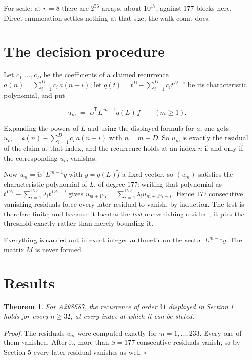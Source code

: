 \documentclass[11pt]{article}
\newtheorem{theorem}{Theorem}
\theoremstyle{definition}
\begin{document}
For scale: at $n = 8$ there are $2^{56}$ arrays, about $10^{17}$, against $177$ blocks here. Direct enumeration settles nothing at that size; the walk count does.

\section{The decision procedure}

Let $c_1,\dots,c_D$ be the coefficients of a claimed recurrence $a(n) = \sum_{i=1}^{D} c_i\,a(n-i)$, let $q(t) = t^{D} - \sum_{i=1}^{D} c_i t^{D-i}$ be its characteristic polynomial, and put

\[u_m \;=\; \tilde w^{\mathsf T} L^{\,m-1} q(L)\,\tilde f \qquad (m \ge 1).\]

Expanding the powers of $L$ and using the displayed formula for $a$, one gets $u_m = a(n) - \sum_{i=1}^{D} c_i\,a(n-i)$ with $n = m + D$. So $u_m$ is exactly the residual of the claim at that index, and the recurrence holds at an index $n$ if and only if the corresponding $u_m$ vanishes.

Now $u_m = \tilde w^{\mathsf T} L^{m-1} y$ with $y = q(L)\tilde f$ a fixed vector, so $(u_m)$ satisfies the characteristic polynomial of $L$, of degree $177$: writing that polynomial as $t^{177} - \sum_{i=1}^{177} \lambda_i t^{177-i}$ gives $u_{m+177} = \sum_{i=1}^{177} \lambda_i u_{m+177-i}$. Hence $177$ consecutive vanishing residuals force every later residual to vanish, by induction. The test is therefore finite; and because it locates the {\itshape last} nonvanishing residual, it pins the threshold exactly rather than merely bounding it.

Everything is carried out in exact integer arithmetic on the vector $L^{m-1}y$. The matrix $M$ is never formed.

\section{Results}

\begin{theorem} For A208687, the recurrence of order $31$ displayed in Section 1 holds for every $n \ge 32$, at every index at which it can be stated.\end{theorem}

{\itshape Proof.} The residuals $u_m$ were computed exactly for $m = 1,\dots,233$. Every one of them vanished. After it, more than $S = 177$ consecutive residuals vanish, so by Section 5 every later residual vanishes as well. $\square$
\end{document}
